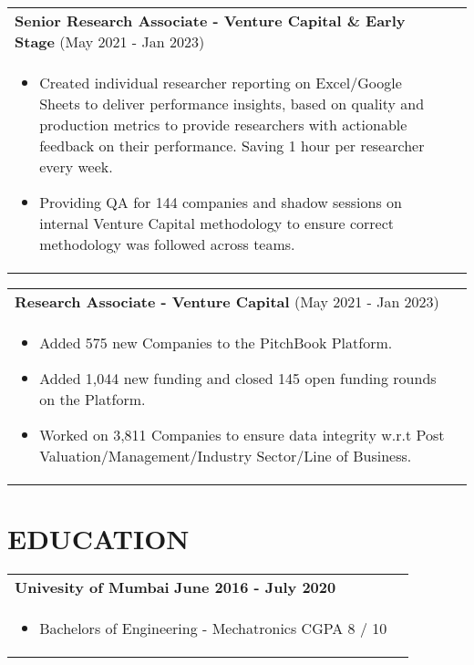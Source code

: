 \documentclass[a4paper,8pt]{article}
\begin{document}
\begin{tabularx}{\linewidth}{ @{}l r@{} }
\textbf{Senior Research Associate - Venture Capital \& Early Stage} (May 2021 - Jan 2023) \\[4pt]
\begin{minipage}[t]{\linewidth}
    \begin{itemize}[nosep,after=\strut, leftmargin=1em, itemsep=2pt]
        \item Created individual researcher reporting on Excel/Google Sheets to deliver performance insights, based on quality and production metrics to provide researchers with actionable feedback on their performance. Saving 1 hour per researcher every week.
        \item Providing QA for 144 companies and shadow sessions on internal Venture Capital methodology to ensure correct methodology was followed across teams.
    \end{itemize}
\end{minipage}
\end{tabularx}

\begin{tabularx}{\linewidth}{ @{}l r@{} }
\textbf{Research Associate - Venture Capital} (May 2021 - Jan 2023) \\[4pt]
\begin{minipage}[t]{\linewidth}
    \begin{itemize}[nosep,after=\strut, leftmargin=1em, itemsep=2pt]
        \item Added 575 new Companies to the PitchBook Platform.
        \item Added 1,044 new funding and closed 145 open funding rounds on the Platform.
        \item Worked on 3,811 Companies to ensure data integrity w.r.t Post Valuation/Management/Industry Sector/Line of Business.
    \end{itemize}
\end{minipage}
\vspace{2mm}
\end{tabularx}

\section{\textbf{EDUCATION}}
\vspace{2mm}
\begin{tabularx}{\linewidth}{ @{}l r@{}}
\textbf{Univesity of Mumbai} \hfill \textbf{June 2016 - July 2020} \\[4pt]
\begin{minipage}[t]{\linewidth}
    \begin{itemize}[nosep,after=\strut, leftmargin=1em, itemsep=2pt]
        \item Bachelors of Engineering - Mechatronics \hfill CGPA 8 / 10
    \end{itemize}
\end{minipage}
\vspace{2mm}
\end{tabularx}
\end{document}
